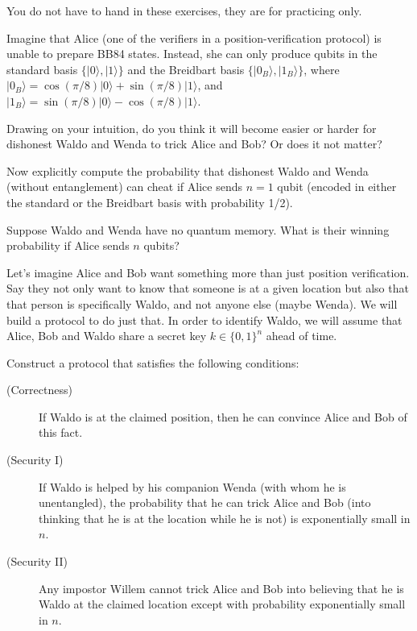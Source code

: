 \documentclass[a4paper,10pt,landscape,twocolumn]{scrartcl}
\newcommand{\ket}[1]{\lvert #1 \rangle}
\begin{document}
\practiceproblems

{\sffamily\noindent
You do not have to hand in these exercises, they are for practicing only. %
}

\begin{exercise}
	Imagine that Alice (one of the verifiers in a position-verification protocol) is unable to prepare BB84 states. Instead, she can only produce qubits in the standard basis $\{\ket0, \ket1\}$ and the Breidbart basis $\{\ket{0_B}, \ket{1_B}\}$, where $\ket{0_B} = \cos(\pi/8)\ket0 + \sin(\pi/8)\ket1$, and $\ket{1_B} = \sin(\pi/8)\ket0 -\cos(\pi/8)\ket1$.
	\begin{subex}
		Drawing on your intuition, do you think it will become easier or harder for dishonest Waldo and Wenda to trick Alice and Bob? Or does it not matter?
	\end{subex}
	\begin{subex}
		Now explicitly compute the probability that dishonest Waldo and Wenda (without entanglement) can cheat if Alice sends $n = 1$ qubit (encoded in either the standard or the Breidbart basis with probability 1/2).
	\end{subex}
	\begin{subex}
		Suppose Waldo and Wenda have no quantum memory. What is their winning probability if Alice sends $n$ qubits?
	\end{subex}
\end{exercise}

\begin{exercise}
	Let's imagine Alice and Bob want something more than just position verification. Say they not only want to know that someone is at a given location but also that that person is specifically Waldo, and not anyone else (maybe Wenda). We will build a protocol to do just that. In order to identify Waldo, we will assume that Alice, Bob and Waldo share a secret key $k \in \{0,1\}^n$ ahead of time.
	
	Construct a protocol that satisfies the following conditions:
	\begin{description}
		\item[(Correctness)] If Waldo is at the claimed position, then he can convince Alice and Bob of this fact.
		\item[(Security I)] If Waldo is helped by his companion Wenda (with whom he is unentangled), the probability that he can trick Alice and Bob (into thinking that he is at the location while he is not) is exponentially small in $n$.
		\item[(Security II)] Any impostor Willem cannot trick Alice and Bob into believing that he is Waldo at the claimed location except with probability exponentially small in $n$.
	\end{description}
\end{exercise}
\end{document}
